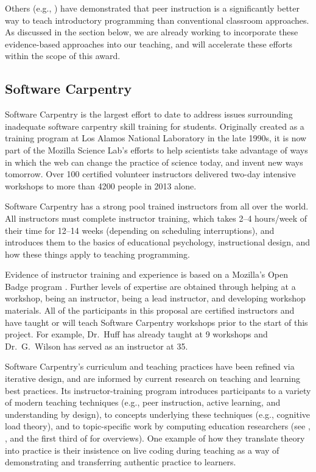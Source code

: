 \documentclass{proposalnsf}
\newlength{\up}
\begin{document}
Others (e.g., \cite{porter2013}) have demonstrated that peer
instruction is a significantly better way to teach introductory
programming than conventional classroom approaches.  As discussed in
the section below, we are already working to incorporate these
evidence-based approaches into our teaching, and will accelerate these
efforts within the scope of this award.

\subsection{Software Carpentry}
\label{sec:SC}

Software Carpentry \cite{swcsite,wilson2012} is the largest effort to
date to address issues surrounding inadequate software carpentry skill
training for students. Originally created as a training program at Los
Alamos National Laboratory in the late 1990s, it is now part of the
Mozilla Science Lab's efforts to help scientists take advantage of
ways in which the web can change the practice of science today, and
invent new ways tomorrow.  Over 100 certified volunteer instructors
delivered two-day intensive workshops to more than 4200 people in 2013
alone.

Software Carpentry has a strong pool trained instructors from all over
 the world. All instructors must complete instructor training, which 
takes 2--4 hours/week of their time for
12--14 weeks (depending on scheduling interruptions), and introduces
them to the basics of educational psychology, instructional design,
and how these things apply to teaching programming.

Evidence of instructor training and experience is based on a Mozilla's
Open Badge program \cite{badges2014}. Further levels of expertise are
obtained through helping at a workshop, being an instructor, being a 
lead instructor, and developing workshop materials. All of the 
participants in this proposal are certified instructors and have 
taught or will teach Software Carpentry workshops prior to the start
of this project. For example, Dr.\ Huff has already taught at 9 
workshops and Dr.\ G.\ Wilson has served as an instructor at 35. 

Software Carpentry's curriculum and teaching practices have been
refined via iterative design, and are informed by current research on
teaching and learning best practices.  Its instructor-training program
\cite{trainingsite} introduces participants to a variety of modern
teaching techniques (e.g., peer instruction, active learning, and
understanding by design), to concepts underlying these techniques
(e.g., cognitive load theory), and to topic-specific work by computing
education researchers (see \cite{guzdial2010}, \cite{hazzan2011}, and
the first third of \cite{sorva2012} for overviews).  One example of
how they translate theory into practice is their insistence on live
coding during teaching as a way of demonstrating and transferring
authentic practice to learners.
\end{document}
